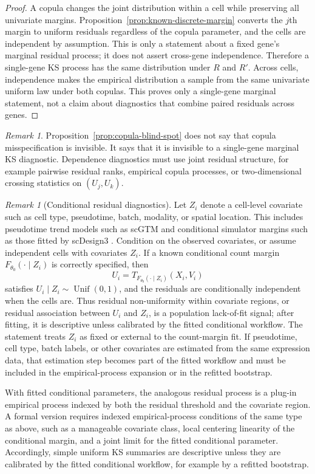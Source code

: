 \documentclass[preprint,12pt]{elsarticle}
\theoremstyle{plain}
\theoremstyle{remark}
\newtheorem{remark}[theorem]{Remark}
\begin{document}
\begin{proof}
A copula changes the joint distribution within a cell while preserving all
univariate margins. Proposition~\ref{prop:known-discrete-margin} converts the
$j$th margin to uniform residuals regardless of the copula parameter, and the
cells are independent by assumption. This is only a statement about a fixed
gene's marginal residual process; it does not assert cross-gene independence.
Therefore a single-gene KS process has the same distribution under $R$ and
$R'$. Across cells, independence makes the empirical distribution a sample from
the same univariate uniform law under both copulas. This proves only a
single-gene marginal statement, not a claim about diagnostics that combine
paired residuals across genes.
\end{proof}

\begin{remark}
Proposition~\ref{prop:copula-blind-spot} does not say that copula
misspecification is invisible. It says that it is invisible to a single-gene
marginal KS diagnostic. Dependence diagnostics must use joint residual
structure, for example pairwise residual ranks, empirical copula processes, or
two-dimensional crossing statistics on $(U_j,U_k)$.
\end{remark}

\begin{remark}[Conditional residual diagnostics]
\label{rem:conditional-residuals}
Let $Z_i$ denote a cell-level covariate such as cell type, pseudotime, batch,
modality, or spatial location. This includes pseudotime trend models such as
scGTM and conditional simulator margins such as those fitted by scDesign3
\citep{cui2022scgtm,song2024scdesign3}. Condition on the observed covariates,
or assume independent cells with covariates $Z_i$. If a known conditional
count margin $F_{\theta_0}(\cdot\mid Z_i)$ is correctly specified, then
\[
U_i=T_{F_{\theta_0}(\cdot\mid Z_i)}(X_i,V_i)
\]
satisfies $U_i\mid Z_i\sim\operatorname{Unif}(0,1)$, and the residuals are
conditionally independent when the cells are. Thus residual non-uniformity
within covariate regions, or residual association between $U_i$ and $Z_i$, is a
population lack-of-fit signal; after fitting, it is descriptive unless
calibrated by the fitted conditional workflow.
The statement treats $Z_i$ as fixed or external to the count-margin fit. If
pseudotime, cell type, batch labels, or other covariates are estimated from the
same expression data, that estimation step becomes part of the fitted workflow
and must be included in the empirical-process expansion or in the refitted
bootstrap.

With fitted conditional parameters, the analogous residual process is a
plug-in empirical process indexed by both the residual threshold and the
covariate region. A formal version requires indexed empirical-process
conditions of the same type as above, such as a manageable covariate class,
local centering linearity of the conditional margin, and a joint limit for the
fitted conditional parameter.
Accordingly, simple uniform KS summaries are descriptive unless they are
calibrated by the fitted conditional workflow, for example by a refitted
bootstrap.
\end{remark}
\end{document}
